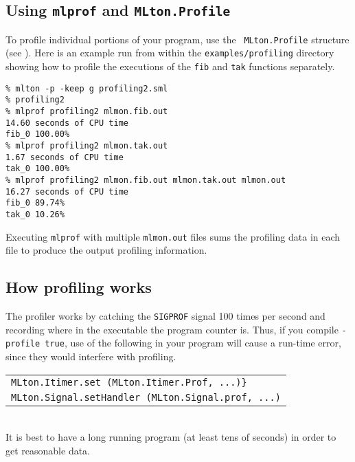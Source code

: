 \subsection{Using {\tt mlprof} and {\tt MLton.Profile}}
To profile individual portions of your program, use the {\tt
MLton.Profile} structure (see ).
Here is an example run from within the {\tt examples/profiling}
directory showing how to profile the executions of the {\tt fib} and
{\tt tak} functions separately.

\begin{verbatim}
% mlton -p -keep g profiling2.sml
% profiling2
% mlprof profiling2 mlmon.fib.out
14.60 seconds of CPU time
fib_0 100.00%
% mlprof profiling2 mlmon.tak.out
1.67 seconds of CPU time
tak_0 100.00%
% mlprof profiling2 mlmon.fib.out mlmon.tak.out mlmon.out
16.27 seconds of CPU time
fib_0 89.74%
tak_0 10.26%
\end{verbatim}

Executing {\tt mlprof} with multiple {\tt mlmon.out} files sums the
profiling data in each file to produce the output profiling
information.

\subsection{How profiling works}

The profiler works by catching the {\tt SIGPROF} signal 100 times per
second and recording where in the executable the program counter is.
Thus, if you compile {\tt -profile true}, use of the following in your
program will cause a run-time error, since they would interfere with
profiling.

\begin{tabular}{l}
\tt MLton.Itimer.set (MLton.Itimer.Prof, ...)\}\\
\tt MLton.Signal.setHandler (MLton.Signal.prof, ...)
\end{tabular}\\
It is best to have a long running program (at least tens of seconds)
in order to get reasonable data.
